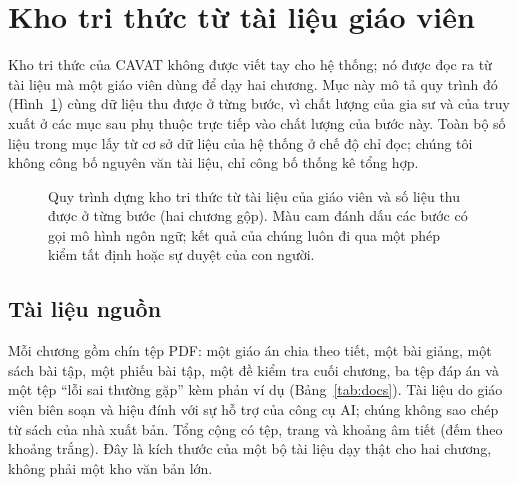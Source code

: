 \section{Kho tri thức từ tài liệu giáo viên}\label{sec:corpus}

Kho tri thức của CAVAT không được viết tay cho hệ thống; nó được đọc ra từ tài liệu mà một giáo viên dùng để dạy hai chương. Mục này mô tả quy trình đó (Hình~\ref{fig:pipeline}) cùng dữ liệu thu được ở từng bước, vì chất lượng của gia sư và của truy xuất ở các mục sau phụ thuộc trực tiếp vào chất lượng của bước này. Toàn bộ số liệu trong mục lấy từ cơ sở dữ liệu của hệ thống ở chế độ chỉ đọc; chúng tôi không công bố nguyên văn tài liệu, chỉ công bố thống kê tổng hợp.

\begin{figure}[tp]
\centering
\resizebox{\linewidth}{!}{}
\caption{Quy trình dựng kho tri thức từ tài liệu của giáo viên và số liệu thu được ở từng bước (hai chương gộp). Màu cam đánh dấu các bước có gọi mô hình ngôn ngữ; kết quả của chúng luôn đi qua một phép kiểm tất định hoặc sự duyệt của con người.}
\label{fig:pipeline}
\end{figure}

\subsection{Tài liệu nguồn}
Mỗi chương gồm chín tệp PDF: một giáo án chia theo tiết, một bài giảng, một sách bài tập, một phiếu bài tập, một đề kiểm tra cuối chương, ba tệp đáp án và một tệp ``lỗi sai thường gặp'' kèm phản ví dụ (Bảng~\ref{tab:docs}). Tài liệu do giáo viên biên soạn và hiệu đính với sự hỗ trợ của công cụ AI; chúng không sao chép từ sách của nhà xuất bản. Tổng cộng có \NDocs{} tệp, \NPages{} trang và khoảng \NSyll{} âm tiết (đếm theo khoảng trắng). Đây là kích thước của một bộ tài liệu dạy thật cho hai chương, không phải một kho văn bản lớn.

\begin{table}[tp]
\centering
\caption{Tài liệu nguồn của hai chương theo loại, số tệp, số trang và số âm tiết.}
\label{tab:docs}

\end{table}

